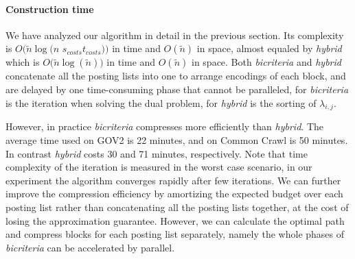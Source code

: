 \documentclass{sig-alternate-05-2015}
\begin{document}
\paragraph*{Construction time}
We have analyzed our algorithm in detail in the previous section.
Its complexity is $ O(\tilde{n} $$ \log(n $ $ s_{costs} $$ t_{costs})) $ in time and $ O(\tilde{n}) $ in space, almost equaled by \textit{hybrid} which is $ O(\tilde{n} $$ \log(\tilde{n})) $ in time and $ O(\tilde{n}) $ in space.
Both \textit{bicriteria} and \textit{hybrid} concatenate all the posting lists into one to arrange encodings of each block, and are delayed by one time-consuming phase that cannot be paralleled, for \textit{bicriteria} is the iteration when solving the dual problem, for \textit{hybrid} is the sorting of $ \lambda_{i,j} $.

However, in practice \textit{bicriteria} compresses more efficiently than \textit{hybrid}.
The average time used on GOV2 is 22 minutes, and on Common Crawl is 50 minutes.
In contrast \textit{hybrid} costs 30 and 71 minutes, respectively.
Note that time complexity of the iteration is measured in the worst case scenario, in our experiment the algorithm converges rapidly after few iterations.
We can further improve the compression efficiency by amortizing the expected budget over each posting list rather than concatenating all the posting lists together, at the cost of losing the approximation guarantee.
However, we can calculate the optimal path and compress blocks for each posting list separately, namely the whole phases of \textit{bicriteria} can be accelerated by parallel.
\end{document}
